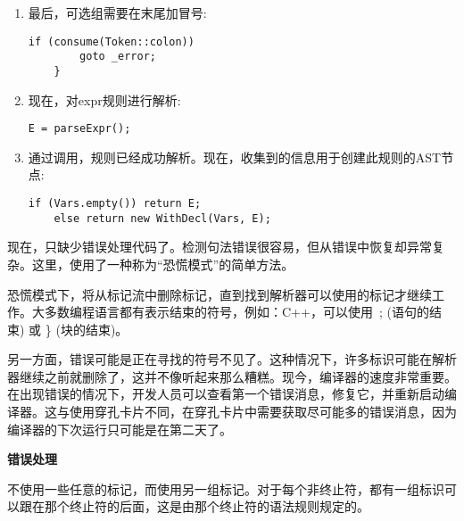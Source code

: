 \begin{enumerate}
\item 最后，可选组需要在末尾加冒号:
\begin{lstlisting}[caption={}]
	if (consume(Token::colon))
		goto _error;
	}
\end{lstlisting}

\item 现在，对expr规则进行解析:
\begin{lstlisting}[caption={}]
	E = parseExpr();
\end{lstlisting}

\item 通过调用，规则已经成功解析。现在，收集到的信息用于创建此规则的AST节点:
\begin{lstlisting}[caption={}]
	if (Vars.empty()) return E;
	else return new WithDecl(Vars, E);
\end{lstlisting}
\end{enumerate}

现在，只缺少错误处理代码了。检测句法错误很容易，但从错误中恢复却异常复杂。这里，使用了一种称为“恐慌模式”的简单方法。\par

恐慌模式下，将从标记流中删除标记，直到找到解析器可以使用的标记才继续工作。大多数编程语言都有表示结束的符号，例如：C++，可以使用\ ; (语句的结束) 或 \} (块的结束)。\par

另一方面，错误可能是正在寻找的符号不见了。这种情况下，许多标识可能在解析器继续之前就删除了，这并不像听起来那么糟糕。现今，编译器的速度非常重要。在出现错误的情况下，开发人员可以查看第一个错误消息，修复它，并重新启动编译器。这与使用穿孔卡片不同，在穿孔卡片中需要获取尽可能多的错误消息，因为编译器的下次运行只可能是在第二天了。\par

\hspace*{\fill} \par %
\textbf{错误处理}

不使用一些任意的标记，而使用另一组标记。对于每个非终止符，都有一组标识可以跟在那个终止符的后面，这是由那个终止符的语法规则规定的。\par

